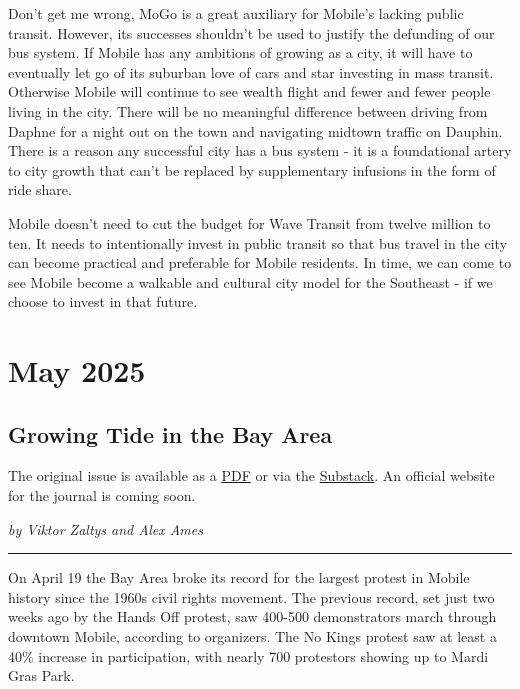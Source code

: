 \documentclass[
]{book}
\begin{document}
Don't get me wrong, MoGo is a great auxiliary for Mobile's lacking public transit. However, its successes shouldn't be used to justify the defunding of our bus system. If Mobile has any ambitions of growing as a city, it will have to eventually let go of its suburban love of cars and star investing in mass transit. Otherwise Mobile will continue to see wealth flight and fewer and fewer people living in the city. There will be no meaningful difference between driving from Daphne for a night out on the town and navigating midtown traffic on Dauphin. There is a reason any successful city has a bus system - it is a foundational artery to city growth that can't be replaced by supplementary infusions in the form of ride share.

Mobile doesn't need to cut the budget for Wave Transit from twelve million to ten. It needs to intentionally invest in public transit so that bus travel in the city can become practical and preferable for Mobile residents. In time, we can come to see Mobile become a walkable and cultural city model for the Southeast - if we choose to invest in that future.

\chapter*{May 2025}\label{may-2025}

\section*{Growing Tide in the Bay Area}\label{growing-tide-in-the-bay-area}

The original issue is available as a \href{https://mobilebaydsa.org/newsletter/may2025.pdf}{PDF} or via the \href{https://viktorzaltys.substack.com/p/mobile-bay-labor-journal}{Substack}. An official website for the journal is coming soon.

\emph{by Viktor Zaltys and Alex Ames}

\begin{center}\rule{0.5\linewidth}{0.5pt}\end{center}

On April 19 the Bay Area broke its record for the largest protest in Mobile history since the 1960s civil rights movement. The previous record, set just two weeks ago by the Hands Off protest, saw 400-500 demonstrators march through downtown Mobile, according to organizers. The No Kings protest saw at least a 40\% increase in participation, with nearly 700 protestors showing up to Mardi Gras Park.
\end{document}
